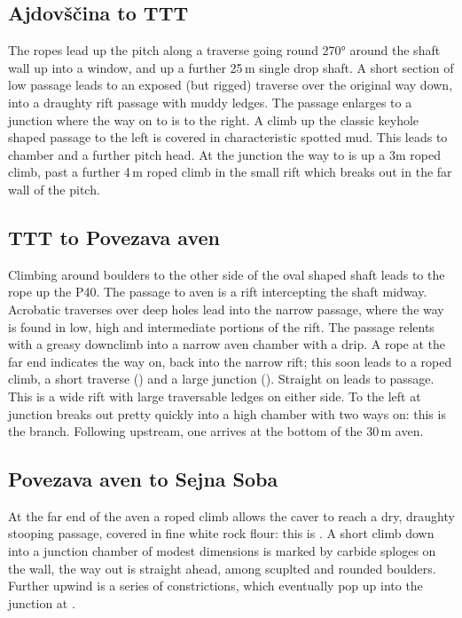 \subsection{Ajdov\v{s}\v{c}ina to TTT}
The ropes lead up the  pitch along a traverse going round 270° around the shaft wall up into a window, and up a further 25\,m single drop shaft. A short section of low passage leads to an exposed (but rigged) traverse over the original way down, into a draughty rift passage with muddy ledges. The passage enlarges to a junction where the way on to  is to the right. A climb up the classic keyhole shaped passage to the left is covered in characteristic spotted mud. This leads to  chamber and a further pitch head. At the junction the way to  is up a 3m roped climb, past a further 4\,m roped climb in the small rift which breaks out in the far wall of the  pitch.

\subsection{TTT to Povezava aven}
Climbing around boulders to the other side of the oval shaped shaft leads to the rope up the P40. The passage to  aven is a rift intercepting the shaft midway. Acrobatic traverses over deep holes lead into the narrow passage, where the way is found in low, high and intermediate portions of the rift. The passage relents with a greasy downclimb into a narrow aven chamber with a drip. A rope at the far end indicates the way on, back into the narrow rift; this soon leads to a roped climb, a short traverse () and a large junction (). Straight on leads to  passage. This is a wide rift with large traversable ledges on either side. To the left at  junction breaks out pretty quickly into a high chamber with two ways on: this is the  branch. Following  upstream, one arrives at the bottom of the 30\,m  aven.

\subsection{Povezava aven to Sejna Soba}
At the far end of the aven a roped climb allows the caver to reach a dry, draughty stooping passage, covered in fine white rock flour: this is . A short climb down into a junction chamber of modest dimensions is marked by carbide sploges on the wall, the way out is straight ahead, among scuplted and rounded boulders. Further upwind is a series of constrictions, which eventually pop up into the junction at .



